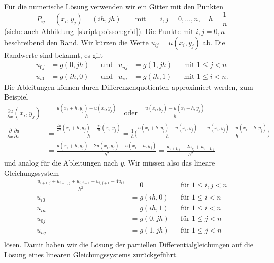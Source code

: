 Für die numerische Lösung verwenden wir ein Gitter mit den Punkten
\[
P_{ij}
=
(x_i,y_j)
=
(ih, jh)
\qquad\text{mit}\qquad
i,j=0,\dots,n,\quad
h = \frac1n
\]
(siehe auch Abbildung~\ref{skript:poisson:grid}).
Die Punkte mit $i,j=0,n$ beschreibend den Rand.
Wir kürzen die Werte $u_{ij}=u(x_i,y_j)$ ab.
Die Randwerte sind bekannt, es gilt
\[
\begin{aligned}
u_{0j} &= g(0,jh)
&&\text{und}&
u_{nj} &= g(1,jh)
&&\text{mit $1\le j < n$}
\\
u_{i0} &= g(ih,0)
&&\text{und}&
u_{in} &= g(ih,1)
&&\text{mit $1\le i < n$.}
\end{aligned}
\]
Die Ableitungen können durch Differenzenquotienten approximiert werden,
zum Beispiel
\begin{align*}
\frac{\partial u}{\partial x}(x_i,y_j)
&=
\frac{u(x_i+h,y_j)-u(x_i,y_j)}{h}
\quad\text{oder}\quad
\frac{u(x_i,y_j)-u(x_i-h,y_j)}{h}
\\
\frac{\partial}{\partial x}
\frac{\partial u}{\partial x}
&=
\frac{\displaystyle
\frac{\partial u}{\partial x}(x_i+h,y_j)
-
\frac{\partial u}{\partial x}(x_i,y_j)
}{h}
=
\frac1h 
\biggl(
\frac{u(x_i+h,y_j) - u(x_i,y_j)}{h}
-
\frac{u(x_i,y_j) - u(x_i-h,y_j)}{h}
\biggr)
\\
&=
\frac{ u(x_i+h,y_j)-2u(x_i,y_j)+u(x_i-h,y_j) }{h^2}
=
\frac{u_{i+1,j}-2u_{ij}+u_{i-1,j}}{h^2}
\end{align*}
und analog für die Ableitungen nach $y$.
Wir müssen also das lineare Gleichungssystem
\begin{equation}
\begin{aligned}
\frac{u_{i+1,j}+u_{i-1,j}+u_{i,j-1}+u_{i,j+1}-4u_{ij}}{h^2} &=0
&&\text{für $1 \le i,j< n$}
\\
u_{i0} &= g(ih, 0)&&\text{für $1\le i<n$}\\
u_{in} &= g(ih, 1)&&\text{für $1\le i<n$}\\
u_{0j} &= g(0, jh)&&\text{für $1\le j<n$}\\
u_{nj} &= g(1, jh)&&\text{für $1\le j<n$}\\
\end{aligned}
\end{equation}
lösen.
Damit haben wir die Lösung der partiellen Differentialgleichungen auf
die Lösung eines linearen Gleichungssystems zurückgeführt.


